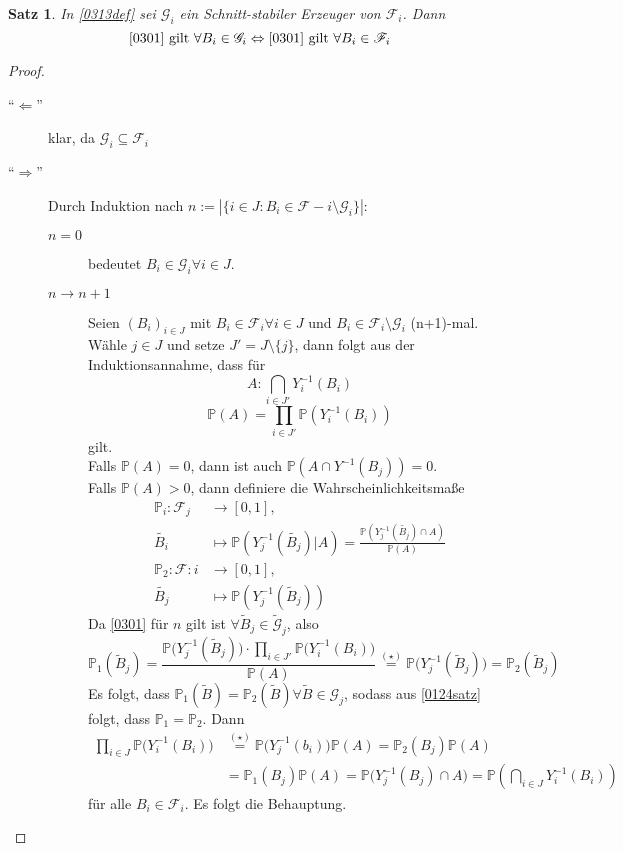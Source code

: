\documentclass[10pt,a4paper]{article}
\newcommand{\Prb}{\mathbb P}
\newcommand{\scF}{\ensuremath{\mathscr{F}}}
\newcommand{\scG}{\mathscr G}
\theoremstyle{plain}
\newtheorem{satz}[theorem]{Satz}
\theoremstyle{definition}
\theoremstyle{remark}
\begin{document}
	\begin{satz}\label{0314satz}
		In \ref{0313def} sei $\scG_i$ ein Schnitt-stabiler Erzeuger von $\scF_i$. Dann
		\[\text{\ref{0301} gilt $\forall B_i\in\scG_i$}\Leftrightarrow\text{\ref{0301} gilt $\forall B_i\in\scF_i$}\]
	\end{satz}
	\begin{proof}
		\begin{description}
			\item[\enquote{$\Leftarrow$}] klar, da $\scG_i\subseteq \scF_i$
			\item[\enquote{$\Rightarrow$}] Durch Induktion nach $n:=|\{i\in J:B_i\in\scF-i\setminus\scG_i\}|$:
			\begin{description}
				\item[$n=0$] bedeutet $B_i\in\scG_i\forall i\in J$.
				\item[$n\to n+1$] Seien $(B_i)_{i\in J}$ mit $B_i\in\scF_i\forall i\in J$ und $B_i\in\scF_i\setminus\scG_i$ (n+1)-mal. Wähle $j\in J$  und setze $J'=J\setminus\{j\}$, dann folgt aus der Induktionsannahme, dass für
				\[A:\bigcap_{i\in J'}Y^{-1}_i(B_i)\]
				\[\Prb(A)=\prod_{i\in J'}\Prb(Y^{-1}_i(B_i))\tag{\star}\]
				gilt.\\
				Falls $\Prb(A)=0$, dann ist auch $\Prb(A\cap Y^{-1}(B_j))=0$.\\
				Falls $\Prb(A)>0$, dann definiere die Wahrscheinlichkeitsmaße
				\begin{align*}
				\Prb_i:\scF_j&\to[0,1],\\ \tilde{B_i}&\mapsto\Prb(Y^{-1}_j(\tilde{B_j})|A)=\frac{\Prb(Y^{-1}_j(\tilde{B_j})\cap A)}{\Prb(A)}\tag{\star\star}\\
				\Prb_2:\scF:i&\to[0,1],\\
				\tilde{B_j}&\mapsto\Prb(Y^{-1}_j(\tilde{B}_j))
				\end{align*}
				Da \ref{0301} für $n$ gilt ist $\forall
				\tilde{B}_j\in\tilde{\scG}_j$, also
				\[\Prb_1(\tilde{B}_j)=\frac{\Prb\big(Y^{-1}_j(\tilde{B}_j)\big)\cdot\prod_{i\in J'}\Prb\big(Y^{-1}_i(B_i)\big)}{\Prb(A)}\overset{(\star)}{=}\Prb\big(Y^{-1}_j(\tilde{B}_j)\big)=\Prb_2(\tilde{B}_j)\]
				Es folgt, dass $\Prb_1(\tilde{B})=\Prb_2(\tilde{B})\forall \tilde{B}\in\scG_j$, sodass aus \ref{0124satz} folgt, dass $\Prb_1=\Prb_2$. Dann
				\begin{align*}
				\prod_{i\in J}\Prb\big(Y^{-1}_i(B_i)\big)&\overset{(\star)}{=}\Prb\big(Y^{-1}_j(b_i)\big)\Prb(A)=\Prb_2(B_j)\Prb(A)\\
				&=\Prb_1(B_j)\Prb(A)=\Prb\big(Y^{-1}_j(B_j)\cap A\big)=\Prb\left(\bigcap_{i\in J}Y^{-1}_i(B_i)\right)
				\end{align*}
				für alle $B_i\in\scF_i$. Es folgt die Behauptung.
			\end{description}
		\end{description}
	\end{proof}
\end{document}
